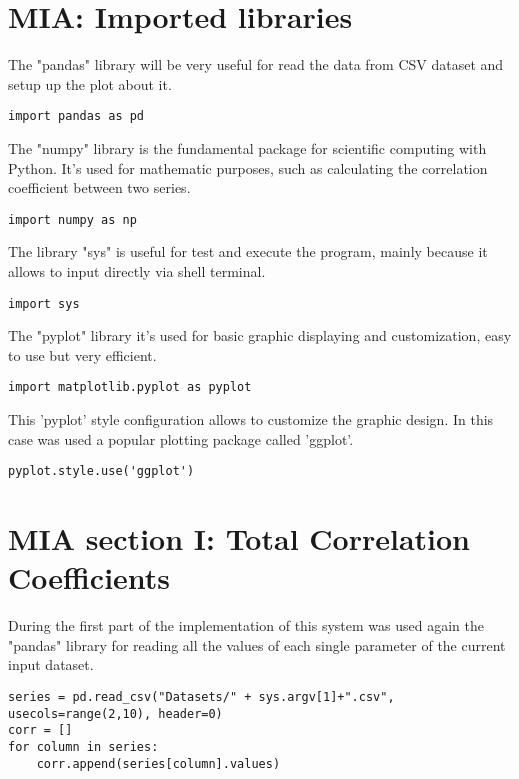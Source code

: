\label{MIA_Implementation}
\section{MIA: Imported libraries}
\label{MIA_Libraries}
The "pandas" library will be very useful for read the data from CSV dataset and setup up the plot about it.
\begin{lstlisting}
import pandas as pd
\end{lstlisting}

The "numpy" library is the fundamental package for scientific computing with Python. It's used for mathematic purposes, such as calculating the correlation coefficient between two series.
\begin{lstlisting}
import numpy as np
\end{lstlisting}

The library "sys" is useful for test and execute the program, mainly because it allows to input directly via shell terminal.
\begin{lstlisting}
import sys
\end{lstlisting}

The "pyplot" library it's used for basic graphic displaying and customization, easy to use but very efficient.
\begin{lstlisting}
import matplotlib.pyplot as pyplot
\end{lstlisting}


This 'pyplot' style configuration allows to customize the graphic design. In this case was used a popular plotting package called 'ggplot'.
\begin{lstlisting}
pyplot.style.use('ggplot')
\end{lstlisting}
 

\section{MIA section I: Total Correlation Coefficients}
\label{MIA_section_I}

During the first part of the implementation of this system was used again the "pandas" library for reading all the values of each single parameter of the current input dataset.
\begin{lstlisting}
series = pd.read_csv("Datasets/" + sys.argv[1]+".csv", usecols=range(2,10), header=0)
corr = []
for column in series:
    corr.append(series[column].values)
\end{lstlisting} 

